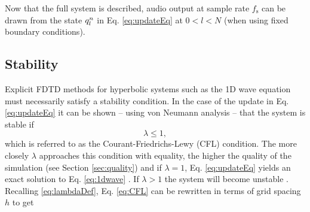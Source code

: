 Now that the full system is described, audio output at sample rate $f_\text{s}$ can be drawn from the state $q_l^n$ in Eq. \eqref{eq:updateEq} at $0 < l < N$ (when using fixed boundary conditions). %

\subsection{Stability}\label{sec:stability}
Explicit FDTD methods for hyperbolic systems such as the 1D wave equation must necessarily satisfy a stability condition. In the case of the update in Eq. \eqref{eq:updateEq} it can be shown -- using von Neumann analysis \cite{Strikwerda1989} -- that the system is stable if
\begin{equation}\label{eq:CFL}
    \lambda \leq 1,
\end{equation}
which is referred to as the Courant-Friedrichs-Lewy (CFL) condition. The more closely $\lambda$ approaches this condition with equality, the higher the quality of the simulation (see Section \ref{sec:quality}) and if $\lambda = 1$, Eq. \eqref{eq:updateEq} yields an exact solution to Eq. \eqref{eq:1dwave}%
. If $\lambda > 1$ the system will become unstable
.
%
Recalling \eqref{eq:lambdaDef}, Eq. \eqref{eq:CFL} can be rewritten in terms of grid spacing $h$ to get
